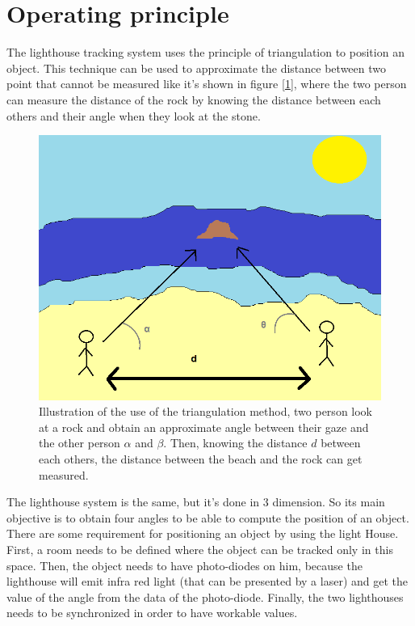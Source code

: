 \documentclass{vldb}
\begin{document}
\section{Operating principle}
The lighthouse tracking system uses the principle of triangulation to position an object. This technique can be used to approximate the distance between two point that cannot be measured like it's shown in figure [\ref{plage}], where the two person can measure the distance of the rock by knowing the distance between each others and their angle when they look at the stone.
\begin{figure}
\centering
\includegraphics[scale=0.35]{Image/plage.png}
\caption{Illustration of the use of the triangulation method, two person look at a rock and obtain an approximate angle between their gaze and the other person $\alpha$ and $\beta$. Then, knowing the distance $d$ between each others, the distance between the beach and the rock can get measured.}
\label{plage}
\end{figure}
The lighthouse system is the same, but it's done in 3 dimension. So its main objective is to obtain four angles to be able to compute the position of an object. 
There are some requirement for positioning an object by using the light House. First, a room needs to be defined where the object can be tracked only in this space. Then, the object needs to have photo-diodes on him, because the lighthouse will emit infra red light (that can be presented by a laser) and get the value of the angle from the data of the photo-diode. Finally, the two lighthouses needs to be synchronized in order to have workable values.
\end{document}
